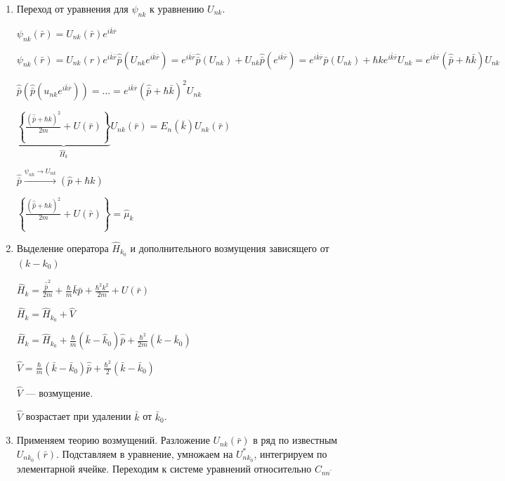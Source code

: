  \begin{enumerate}
    \item Переход от уравнения для $\psi_{nk}$ к уравнению $U_{nk}$. 
    
    $\psi_{n k}(\bar{r})=U_{n k}(\bar{r}) e^{i \bar{k} \bar{r}}$ 
    
    $\displaystyle \psi_{n k}(\bar{r})=U_{n k}(r) e^{i \bar{k} \bar{r}} \hat{\bar{p}}\left(U_{n k} e^{i \bar{k} \bar{r}}\right)=e^{i \bar{k} \bar{r}} \hat{\bar{p}} \left( U_{n k} \right) + U_{n k} \hat{\bar{p}} \left( e^{i \bar{k} \bar{r}} \right) =e^{i \bar{k} \bar{r}} \hat{\bar{p}} \left( U_{n k} \right)+ \hbar k  e^{i \bar{k} \bar{r}}U_{n k}= e^{i \bar{k} \bar{r}}(\hat{\bar{p}}+\hbar \bar{k}) U_{n k}$
    
    $\hat{\bar{p}} \left( \hat{\bar{p}}\left(u_{n k} e^{i \bar{k} \bar{r}}\right) \right) =\ldots=e^{i \bar{k} \bar{r}}(\hat{\bar{p}}+ \hbar \bar{k})^2 U_{n k}$
    
    $\displaystyle \underbrace{\left\{\frac{(\hat{\bar{p}}+\hbar k)^2}{2 m}+U(\bar{r})\right\}}_{\hat{H}_k} U_{nk}(\bar{r}) =E_n(\bar{k}) U_{n k}(\bar{r})$


    $\hat{\bar{p}} \overset{\psi_{nk} \rightarrow U_{nk}}{\longrightarrow} (\hat{p}+\hbar k)$

    $\left\{\frac{(\hat{\hat{p}}+\hbar k)^2}{2 m}+U(\bar{r})\right\}=\hat{\mu}_k$

    \item Выделение оператора $\hat{H}_{k_0}$ и дополнительного возмущения зависящего от $(k-k_0)$
    
    $\displaystyle \hat{H}_k=\frac{\hat{\bar{p}}^2}{2 m}+\frac{\hbar}{m} \bar{k}\bar{p}+\frac{\hbar^2 k^2}{2 m} +U(\bar{r})$
    
    $\displaystyle \hat{H}_k=\hat{H}_{k_0}+\hat{V}$
    
    $\displaystyle \hat{H}_k=\hat{H}_{k_0}+\frac{\hbar}{m}\left(\bar{k}-\hat{k}_0\right) \hat{\bar{p}}+\frac{\hbar^2}{2 m}\left(\bar{k}-\bar{k}_0\right)$
    
    $\displaystyle \hat{V}=\frac{\hbar}{m}\left(\bar{k}-\bar{k}_0\right) \hat{\bar{p}}+\frac{\hbar^2}{2}\left(\bar{k}-\bar{k}_0\right) $

    $\hat{V}$ --- возмущение.

    $\displaystyle \hat{V}$ возрастает при удалении $\bar{k}$  от $\bar{k}_0$.

    \item Применяем теорию возмущений. Разложение $U_{nk}(\bar{r})$ в ряд по известным $U_{nk_0}(\bar{r})$. Подставляем в уравнение, умножаем на $U^*_{nk_0}$, интегрируем по элементарной ячейке. Переходим к системе уравнений относительно $C_{nn^\prime}$
    

\end{enumerate}
